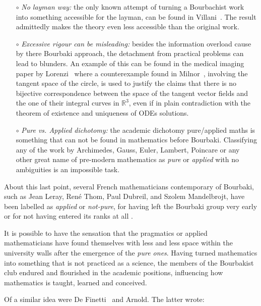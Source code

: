\documentclass[]{scrartcl}
\theoremstyle{definition}
\begin{document}
\begin{itemize}
    \item[$\circ$] \emph{No layman way:} the only known attempt of turning a Bourbachist work into something accessible for the layman, can be found in Villani~\cite{villani2003livingtheorem}. The result admittedly makes the theory even less accessible than the original work.
    
    \item[$\circ$] \emph{Excessive rigour can be misleading:} besides the information overload cause by there Bourbaki approach, the detachment from practical problems can lead to blunders. An example of this can be found in the medical imaging paper by Lorenzi~\cite{lorenzi2013geodesics} where a counterexample found in Milnor~\cite{milnor1984remarks}, involving the tangent space of the circle, is used to justify the claims that there is no bijective correspondence between the space of the tangent vector fields and the one of their integral curves in $\mathbb{R}^3$, even if in plain contradiction with the theorem of existence and uniqueness of ODEs solutions.

    \item[$\circ$] \emph{Pure vs. Applied dichotomy:} the academic dichotomy pure/applied maths is something that can not be found in mathematics before Bourbaki. 
    Classifying any of the work by Archimedes, Gauss, Euler, Lambert, Poincare or any other great name of pre-modern mathematics as \emph{pure} or \emph{applied} with no ambiguities is an impossible task.
     
\end{itemize}

About this last point, several French mathematicians contemporary of Bourbaki, such as Jean Leray, René Thom, Paul Dubreil, and Szolem Mandelbrojt, have been labelled as \emph{applied} or \emph{not-pure}, for having left the Bourbaki group very early or for not having entered its ranks at all \cite{barcellos1984interview, atiyah2007bourbaki}.

It is possible to have the sensation that the pragmatics or applied mathematicians have found themselves with less and less space within the university walls after the emergence of the \emph{pure ones}. Having turned mathematics into something that is not practiced as a science, the members of the Bourbakist club endured and flourished in the academic positions, influencing how mathematics is taught, learned and conceived.

Of a similar idea were De Finetti~\cite{de2008bruno} and Arnold. The latter wrote:
\end{document}
